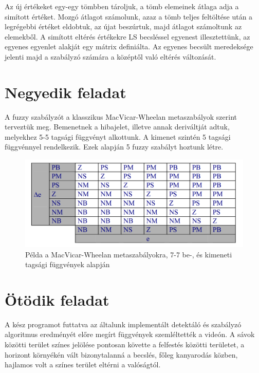 Az új értékeket egy-egy tömbben tároljuk, a tömb elemeinek átlaga adja a simított értéket. Mozgó átlagot számolunk, azaz a tömb teljes feltöltése után a legrégebbi értéket eldobtuk, az újat beszúrtuk, majd átlagot számoltunk az elemekből.
A simított eltérés értékekre LS becsléssel egyenest illesztettünk, az egyenes egyenlet alakját egy mátrix definiálta. Az egyenes becsült meredeksége jelenti majd a szabályzó számára a középtől való eltérés változását.


\newpage
\section{Negyedik feladat}
A fuzzy szabályzót a klasszikus MacVicar-Wheelan metaszabályok szerint terveztük meg. Bemenetnek a hibajelet, illetve annak deriváltját adtuk, melyekhez 5-5 tagsági függvényt alkottunk. A kimenet szintén 5 tagsági függvénnyel rendelkezik. Ezek alapján 5 fuzzy szabályt hoztunk létre.

\begin{figure}[!ht]
	\includegraphics[width=150mm,keepaspectratio]{figures/m09/mcw.png}
	\caption{Példa a MacVicar-Wheelan metaszabályokra, 7-7 be-, és kimeneti tagsági függvények alapján}
	\label{fig:MCW}
\end{figure}


\section{Ötödik feladat}
A kész programot futtatva az általunk implementált detektáló és szabályzó algoritmus eredményét előre megírt függvények szemléltették a videón. A sávok közötti terület színes jelölése pontosan követte a felfestés közötti területet, a horizont környékén vált bizonytalanná a becslés, főleg kanyarodás közben, hajlamos volt a színes terület eltérni a valóságtól. 

